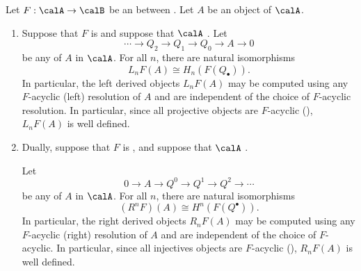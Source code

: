 \begin{proposition} \label{proposition:left_right_derived_objects_for_a_right_left_exact_functor_between_abelian_categories_may_be_computed_with_acyclic_resolutions}
    Let $F: \calA \to \calB$ be an  between . Let $A$ be an object of $\calA$. 
    \begin{enumerate}
        \item Suppose that $F$ is  and suppose that $\calA$ .
        Let 
        $$\cdots \to Q_2 \to Q_1 \to Q_0 \to A \to 0$$
        be any  of $A$ in $\calA$. For all $n$, there are natural isomorphisms
        $$L_nF(A) \cong H_n(F(Q_\bullet)).$$
        In particular, the left derived objects $L_n F (A)$ may be computed using any $F$-acyclic (left) resolution of $A$ and are independent of the choice of $F$-acyclic resolution. In particular, since all projective objects are $F$-acyclic (), $L_n F(A)$ is well defined.

        \item Dually, suppose that $F$ is , and suppose that $\calA$ .
        
        Let 
        $$0 \to A \to Q^0 \to Q^1 \to Q^2 \to \cdots$$
        be any  of $A$ in $\calA$. For all $n$, there are natural isomorphisms
        $$(R^n F)(A) \cong H^n(F(Q^\bullet)).$$
        In particular, the right derived objects $R_n F (A)$ may be computed using any $F$-acyclic (right) resolution of $A$ and are independent of the choice of $F$-acyclic. In particular, since all injectives objects are $F$-acyclic (), $R_n F(A)$ is well defined.
    \end{enumerate}
\end{proposition}


